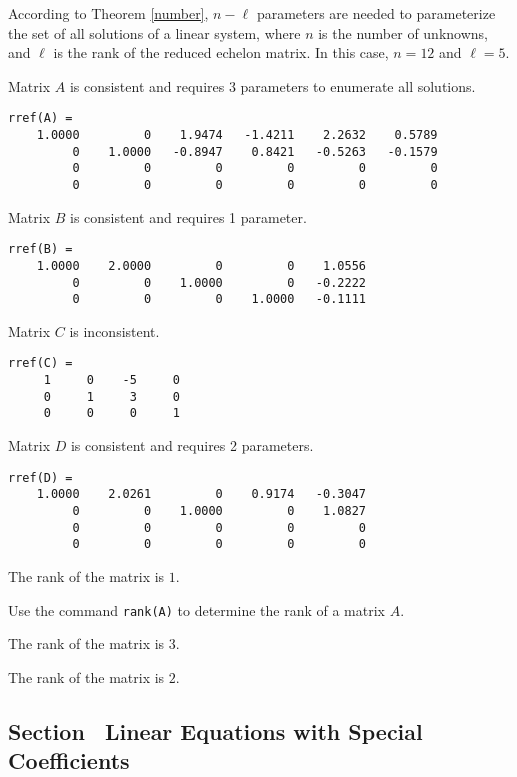 \soln According to Theorem \ref{number}, $n - \ell$
parameters are needed to parameterize the set of all solutions of a
linear system, where $n$ is the number of unknowns, and $\ell$ is the
rank of the reduced echelon matrix.  In this case, $n = 12$ and $\ell =
5$.


\ans Matrix $A$ is consistent and requires 3 parameters to enumerate
all solutions.

\soln
\begin{verbatim}
rref(A) = 
    1.0000         0    1.9474   -1.4211    2.2632    0.5789
         0    1.0000   -0.8947    0.8421   -0.5263   -0.1579
         0         0         0         0         0         0
         0         0         0         0         0         0
\end{verbatim}

\ans Matrix $B$ is consistent and requires 1 parameter.

\soln
\begin{verbatim}
rref(B) =
    1.0000    2.0000         0         0    1.0556
         0         0    1.0000         0   -0.2222
         0         0         0    1.0000   -0.1111
\end{verbatim}

\ans Matrix $C$ is inconsistent.

\soln
\begin{verbatim}
rref(C) =
     1     0    -5     0
     0     1     3     0
     0     0     0     1
\end{verbatim}

\newpage
{}
\ans Matrix $D$ is consistent and requires 2 parameters.

\soln
\begin{verbatim}
rref(D) =
    1.0000    2.0261         0    0.9174   -0.3047
         0         0    1.0000         0    1.0827
         0         0         0         0         0
         0         0         0         0         0
\end{verbatim}

 \ans The rank of the matrix is $1$.

\soln Use the \Matlab command {\tt rank(A)} to determine the rank of a 
matrix $A$.

 The rank of the matrix is $3$.

 The rank of the matrix is $2$.


\subsection*{Section~\protect{\ref{S:specialcoeff}} Linear Equations with
Special Coefficients}


